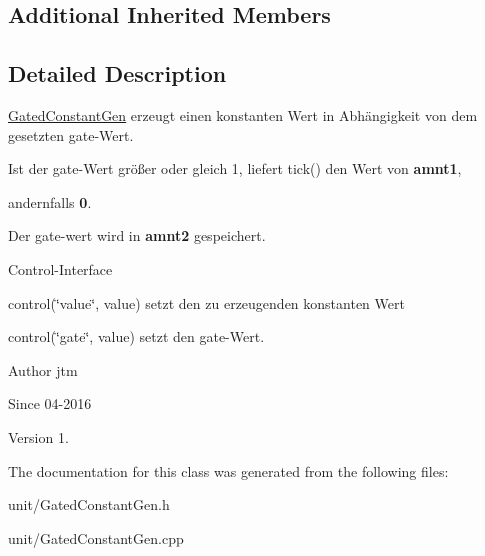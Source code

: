 \subsection*{Additional Inherited Members}


\subsection{Detailed Description}
\hyperlink{classunit_1_1GatedConstantGen}{Gated\+Constant\+Gen} erzeugt einen konstanten Wert in Abhängigkeit von dem gesetzten gate-\/\+Wert.


\begin{DoxyItemize}
\item Ist der gate-\/\+Wert größer oder gleich 1, liefert tick() den Wert von {\bfseries amnt1},
\item andernfalls {\bfseries 0}.
\item Der gate-\/wert wird in {\bfseries amnt2} gespeichert.
\end{DoxyItemize}

Control-\/\+Interface


\begin{DoxyItemize}
\item control(\char`\"{}value\char`\"{}, value) setzt den zu erzeugenden konstanten Wert
\item control(\char`\"{}gate\char`\"{}, value) setzt den gate-\/\+Wert.
\end{DoxyItemize}

\begin{DoxyAuthor}{Author}
jtm 
\end{DoxyAuthor}
\begin{DoxySince}{Since}
04-\/2016 
\end{DoxySince}
\begin{DoxyVersion}{Version}
1. 
\end{DoxyVersion}


The documentation for this class was generated from the following files\+:\begin{DoxyCompactItemize}
\item 
unit/Gated\+Constant\+Gen.\+h\item 
unit/Gated\+Constant\+Gen.\+cpp\end{DoxyCompactItemize}
